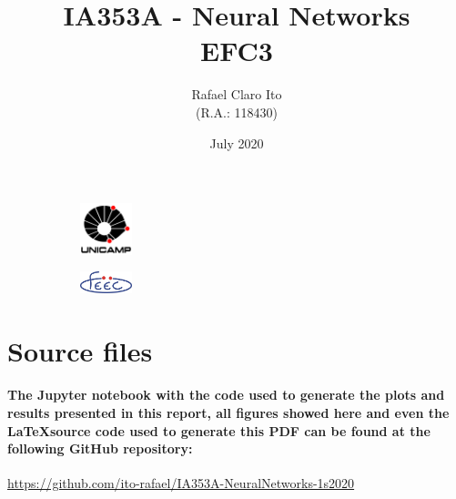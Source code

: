\documentclass[a4paper]{article}    %
\begin{document}
\begin{figure}
    \centering
    \begin{subfigure}{0.45\textwidth}
        \centering
        \includegraphics[width=1.5cm]{unicamp}
    \end{subfigure}
    \hfill
    \begin{subfigure}{0.45\textwidth}
        \centering
        \includegraphics[width=1.5cm]{feec}
    \end{subfigure}
\end{figure}

\title{
    \vspace{5cm}
    IA353A - Neural Networks\\
    EFC3
    \vspace{1cm}
}
\author{
    Rafael Claro Ito\\
    (R.A.: 118430)
    \vspace{11cm}
}
\date{July 2020}
\maketitle
\newpage

\section{Source files}

\paragraph{The Jupyter notebook with the code used to generate the plots and results presented in this report, all figures showed here and even the \LaTeX \space source code used to generate this PDF can be found at the following GitHub repository:}

\begin{center}
    {\url{https://github.com/ito-rafael/IA353A-NeuralNetworks-1s2020}}
\end{center}
\end{document}
